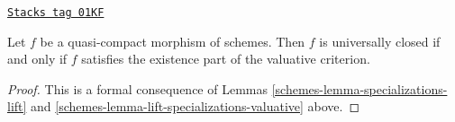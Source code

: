 \begin{proposition}

\label{schemes-proposition-characterize-universally-closed}
\href{https://stacks.math.columbia.edu/tag/01KF}{\texttt{Stacks tag 01KF}}

Let $f$ be a quasi-compact morphism of schemes.
Then $f$ is universally closed if and only if $f$
satisfies the existence part of the valuative criterion.
\end{proposition}

\begin{proof}

This is a formal consequence of
Lemmas \ref{schemes-lemma-specializations-lift} and
\ref{schemes-lemma-lift-specializations-valuative} above.
\end{proof}

